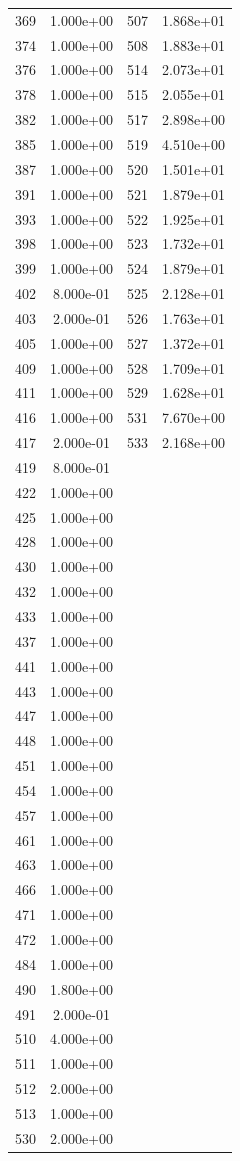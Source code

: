 \documentclass[12pt]{article}
\begin{document}
\begin{longtable}{@{}cccc@{}}
369 & 1.000e+00 & 507 & 1.868e+01 \\
374 & 1.000e+00 & 508 & 1.883e+01 \\
376 & 1.000e+00 & 514 & 2.073e+01 \\
378 & 1.000e+00 & 515 & 2.055e+01 \\
382 & 1.000e+00 & 517 & 2.898e+00 \\
385 & 1.000e+00 & 519 & 4.510e+00 \\
387 & 1.000e+00 & 520 & 1.501e+01 \\
391 & 1.000e+00 & 521 & 1.879e+01 \\
393 & 1.000e+00 & 522 & 1.925e+01 \\
398 & 1.000e+00 & 523 & 1.732e+01 \\
399 & 1.000e+00 & 524 & 1.879e+01 \\
402 & 8.000e-01 & 525 & 2.128e+01 \\
403 & 2.000e-01 & 526 & 1.763e+01 \\
405 & 1.000e+00 & 527 & 1.372e+01 \\
409 & 1.000e+00 & 528 & 1.709e+01 \\
411 & 1.000e+00 & 529 & 1.628e+01 \\
416 & 1.000e+00 & 531 & 7.670e+00 \\
417 & 2.000e-01 & 533 & 2.168e+00 \\
419 & 8.000e-01 &  &  \\
422 & 1.000e+00 &  &  \\
425 & 1.000e+00 &  &  \\
428 & 1.000e+00 &  &  \\
430 & 1.000e+00 &  &  \\
432 & 1.000e+00 &  &  \\
433 & 1.000e+00 &  &  \\
437 & 1.000e+00 &  &  \\
441 & 1.000e+00 &  &  \\
443 & 1.000e+00 &  &  \\
447 & 1.000e+00 &  &  \\
448 & 1.000e+00 &  &  \\
451 & 1.000e+00 &  &  \\
454 & 1.000e+00 &  &  \\
457 & 1.000e+00 &  &  \\
461 & 1.000e+00 &  &  \\
463 & 1.000e+00 &  &  \\
466 & 1.000e+00 &  &  \\
471 & 1.000e+00 &  &  \\
472 & 1.000e+00 &  &  \\
484 & 1.000e+00 &  &  \\
490 & 1.800e+00 &  &  \\
491 & 2.000e-01 &  &  \\
510 & 4.000e+00 &  &  \\
511 & 1.000e+00 &  &  \\
512 & 2.000e+00 &  &  \\
513 & 1.000e+00 &  &  \\
530 & 2.000e+00 &  &  \\

\bottomrule
\end{longtable}
\end{document}
